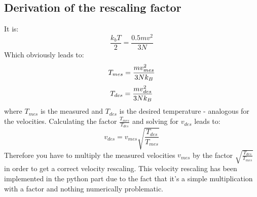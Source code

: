\documentclass[12pt,a4paper]{scrartcl}
\begin{document}
 \subsection{Derivation of the rescaling factor}
 It is: 
 \begin{equation}
 \frac{k_bT}{2}=\frac{0.5mv^2}{3N}
 \end{equation}
 Which obviously leads to:
  \begin{equation}\nonumber
 T_{mes}=\frac{mv_{mes}^2}{3Nk_B} \\
 \end{equation}
\begin{equation}\nonumber
  T_{des}=\frac{mv_{des}^2}{3Nk_B} \\
\end{equation}
where $T_{mes}$ is the measured and $T_{des}$ is the desired temperature - analogous for the velocities.
Calculating the factor $\frac{T_{mes}}{T_{des}}$ and solving for $v_{des}$ leads to:
\begin{equation}
v_{des}=v_{mes} \sqrt{\frac{T_{des}}{T_{mes}}}
\end{equation}
Therefore you have to multiply the measured velocities $v_{mes}$ by the factor $\sqrt{\frac{T_{des}}{T_{mes}}}$ in order to get a correct velocity rescaling.
\newline
\newline
This velocity rescaling has been implemented in the python part due to the fact that it's a simple multiplication with a factor and nothing numerically problematic.
\end{document}
